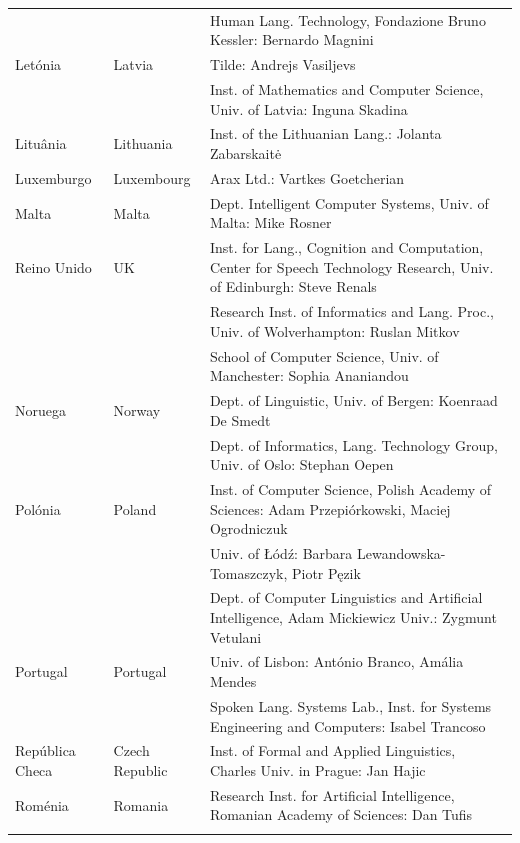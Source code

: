\begin{longtable}{llp{105mm}}
  & & Human Lang. Technology, Fondazione Bruno Kessler: Bernardo Magnini \\ \addlinespace 
  Letónia & \textcolor{grey1}{Latvia} & Tilde: Andrejs Vasiljevs \\ \addlinespace 
  & & Inst. of Mathematics and Computer Science, Univ. of Latvia: Inguna Skadina\\ \addlinespace
  Lituânia & \textcolor{grey1}{Lithuania} & Inst. of the Lithuanian Lang.: Jolanta Zabarskaitė \\ \addlinespace
  Luxemburgo & \textcolor{grey1}{Luxembourg} & Arax Ltd.: Vartkes Goetcherian \\ \addlinespace
  Malta & \textcolor{grey1}{Malta} & Dept. Intelligent Computer Systems, Univ. of Malta: Mike Rosner \\ \addlinespace Reino Unido & \textcolor{grey1}{UK} & Inst. for Lang., Cognition and Computation, Center for Speech Technology Research, Univ. of Edinburgh: Steve Renals \\ \addlinespace 
  & & Research Inst. of Informatics and Lang. Proc., Univ. of Wolverhampton: Ruslan Mitkov \\ \addlinespace 
  & & School of Computer Science, Univ. of Manchester: Sophia Ananiandou \\ \addlinespace 
  Noruega & \textcolor{grey1}{Norway} & Dept. of Linguistic, Univ. of Bergen: Koenraad De Smedt \\ \addlinespace 
  & & Dept. of Informatics, Lang. Technology Group, Univ. of Oslo: Stephan Oepen \\ \addlinespace
  Polónia & \textcolor{grey1}{Poland} & Inst. of Computer Science, Polish Academy of Sciences: Adam Przepiórkowski, Maciej Ogrodniczuk \\ \addlinespace
  & & Univ. of Łódź: Barbara Lewandowska-Tomaszczyk, Piotr Pęzik \\ \addlinespace
  & & Dept. of Computer Linguistics and Artificial Intelligence, Adam Mickiewicz Univ.: Zygmunt Vetulani \\ \addlinespace
  Portugal & \textcolor{grey1}{Portugal} & Univ. of Lisbon: António Branco, Amália Mendes \\ \addlinespace
  & & Spoken Lang. Systems Lab., Inst. for Systems Engineering and Computers: Isabel Trancoso \\ \addlinespace
  República Checa & \textcolor{grey1}{Czech Republic} & Inst. of Formal and Applied Linguistics, Charles Univ. in Prague: Jan Hajic \\ \addlinespace
  Roménia & \textcolor{grey1}{Romania} & Research Inst. for Artificial Intelligence, Romanian Academy of Sciences: Dan Tufis \\ \addlinespace

\end{longtable}
